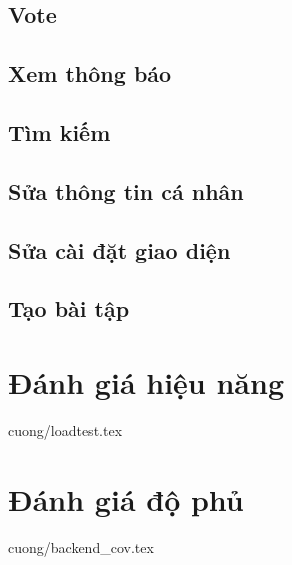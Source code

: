 \documentclass{uetgraduation}
\begin{document}
\subsection{Vote}


\subsection{Xem thông báo}


\subsection{Tìm kiếm}


\subsection{Sửa thông tin cá nhân}


\subsection{Sửa cài đặt giao diện}


\subsection{Tạo bài tập}



\section{Đánh giá hiệu năng}

 {cuong/loadtest.tex}

\section{Đánh giá độ phủ}

 {cuong/backend_cov.tex}
\end{document}
